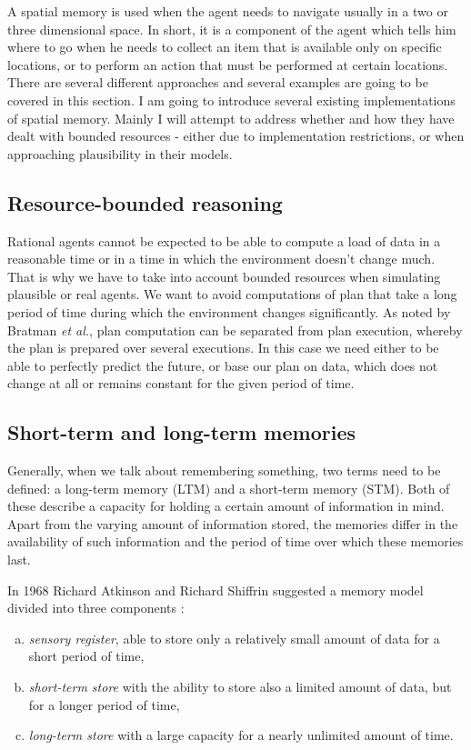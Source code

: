 A spatial memory is used when the agent needs to navigate usually in a two or three dimensional space. In short, it is a component of the agent which tells him where to go when he needs to collect an item that is available only on specific locations, or to perform an action that must be performed at certain locations. There are several different approaches and several examples are going to be covered in this section. I am going to introduce several existing implementations of spatial memory. Mainly I will attempt to address whether and how they have dealt with bounded resources - either due to implementation restrictions, or when approaching plausibility in their models.

\subsection{Resource-bounded reasoning}

Rational agents cannot be expected to be able to compute a load of data in a reasonable time or in a time in which the environment doesn't change much. That is why we have to take into account bounded resources when simulating plausible or real agents. We want to avoid computations of plan that take a long period of time during which the environment changes significantly. As noted by Bratman \textit{et al.}, plan computation can be separated from plan execution, whereby the plan is prepared over several executions. \cite{Bratman:practicalreasoning} In this case we need either to be able to perfectly predict the future, or base our plan on data, which does not change at all or remains constant for the given period of time.

\subsection{Short-term and long-term memories}

Generally, when we talk about remembering something, two terms need to be defined: a long-term memory (LTM) and a short-term memory (STM). Both of these describe a capacity for holding a certain amount of information in mind. Apart from the varying amount of information stored, the memories differ in the availability of such information and the period of time over which these memories last.      

In 1968 Richard Atkinson and Richard Shiffrin suggested a memory model divided into three components \cite{Atkinson:humanmemory}: 

\begin{enumerate}[(a)]
\item \emph{sensory register}, able to store only a relatively small amount of data for a short period of time,
\item \emph{short-term store} with the ability to store also a limited amount of data, but for a longer period of time,
\item \emph{long-term store} with a large capacity for a nearly unlimited amount of time.
\end{enumerate}

